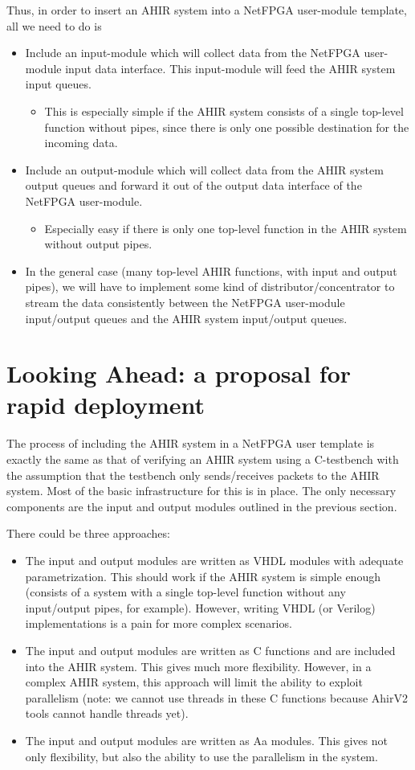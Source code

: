 \documentclass{article}
\begin{document}
Thus, in order to insert an AHIR system into a NetFPGA user-module template,
all we need to do is
\begin{itemize}
\item Include an input-module which will collect data from the NetFPGA user-module
input data interface.  This input-module will feed the AHIR system input queues.
\begin{itemize}
\item This is especially simple if the AHIR system consists of a single top-level
function without pipes, since there is only one possible destination for the
incoming data.
\end{itemize}
\item Include an output-module which will collect data from the AHIR system
output queues
and forward it out of the output data interface of the NetFPGA user-module.
\begin{itemize}
\item Especially easy if there is only one top-level function in the AHIR
system without output pipes.
\end{itemize}
\item  In the general case (many top-level AHIR functions, with input and output
pipes), we will have to implement some kind of distributor/concentrator to
stream the data consistently between the NetFPGA user-module
input/output queues and the AHIR system input/output queues.
\end{itemize}

\section{Looking Ahead: a proposal for rapid deployment}

The process of including the AHIR system in a NetFPGA user template is
exactly the same as that of verifying an AHIR system using a C-testbench
with the assumption that the testbench only sends/receives packets to the AHIR 
system.  Most of the basic infrastructure for this is in place.  The only
necessary components are the input and output modules outlined in the 
previous section.

There could be three approaches:
\begin{itemize}
\item The input and output modules are written as VHDL modules with
adequate parametrization.  This should work if the AHIR system is
simple enough (consists of a system with a single top-level function
without any input/output pipes, for example).  However, writing
VHDL (or Verilog) implementations is a pain for more complex scenarios.
\item The input and output modules are written as C functions and
are included into the AHIR system.  This gives much more flexibility.
However, in a complex AHIR system, this approach will limit the
ability to exploit parallelism (note: we cannot use threads in these
C functions because AhirV2 tools cannot handle threads yet).
\item The input and output modules are written as Aa modules.  This
gives not only flexibility, but also the ability to use the
parallelism in the system.
\end{itemize}
\end{document}
